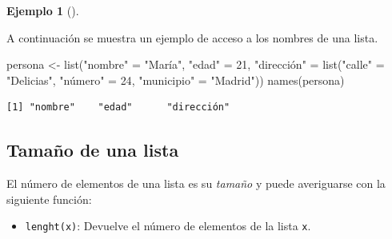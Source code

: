 \documentclass[
  a4paper,
]{scrreport}
\newenvironment{Shaded}{\begin{snugshade}}{\end{snugshade}}
\newcommand{\DecValTok}[1]{\textcolor[rgb]{0.68,0.00,0.00}{#1}}
\newcommand{\FunctionTok}[1]{\textcolor[rgb]{0.28,0.35,0.67}{#1}}
\newcommand{\NormalTok}[1]{\textcolor[rgb]{0.00,0.23,0.31}{#1}}
\newcommand{\OtherTok}[1]{\textcolor[rgb]{0.00,0.23,0.31}{#1}}
\newcommand{\StringTok}[1]{\textcolor[rgb]{0.13,0.47,0.30}{#1}}
\providecommand{\tightlist}{%
  \setlength{\itemsep}{0pt}\setlength{\parskip}{0pt}}\usepackage{longtable,booktabs,array}
\theoremstyle{definition}
\newtheorem{example}{Ejemplo}[chapter]
\theoremstyle{definition}
\theoremstyle{remark}
\begin{document}
\leavevmode{}%
\begin{example}[]\label{exm-acceso-listas}

A continuación se muestra un ejemplo de acceso a los nombres de una
lista.

\begin{Shaded}
\begin{Highlighting}[]
\NormalTok{persona }\OtherTok{\textless{}{-}} \FunctionTok{list}\NormalTok{(}\StringTok{"nombre"} \OtherTok{=} \StringTok{"María"}\NormalTok{, }\StringTok{"edad"} \OtherTok{=} \DecValTok{21}\NormalTok{, }\StringTok{"dirección"} \OtherTok{=} \FunctionTok{list}\NormalTok{(}\StringTok{"calle"} \OtherTok{=} \StringTok{"Delicias"}\NormalTok{, }\StringTok{"número"} \OtherTok{=} \DecValTok{24}\NormalTok{, }\StringTok{"municipio"} \OtherTok{=} \StringTok{"Madrid"}\NormalTok{))}
\FunctionTok{names}\NormalTok{(persona)}
\end{Highlighting}
\end{Shaded}

\begin{verbatim}
[1] "nombre"    "edad"      "dirección"
\end{verbatim}

\end{example}

\hypertarget{tamauxf1o-de-una-lista}{%
\subsection{Tamaño de una lista}\label{tamauxf1o-de-una-lista}}

El número de elementos de una lista es su \emph{tamaño} y puede
averiguarse con la siguiente función:

\begin{itemize}
\tightlist
\item
  \texttt{lenght(x)}: Devuelve el número de elementos de la lista
  \texttt{x}.
\end{itemize}
\end{document}
